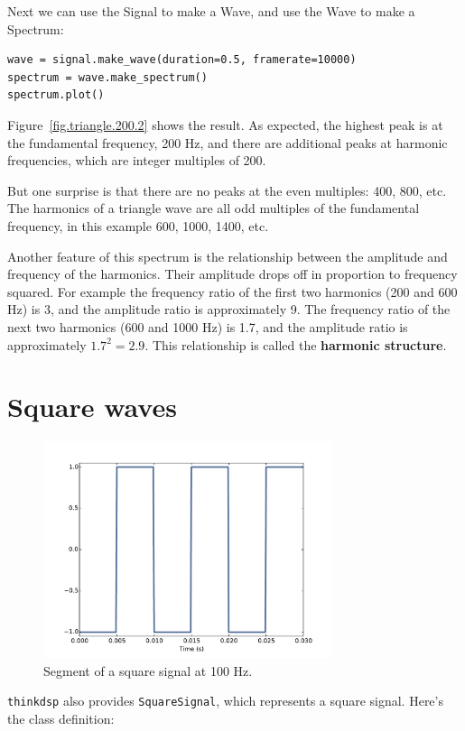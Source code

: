 \documentclass[12pt]{book}
\begin{document}
Next we can use the Signal to make a Wave, and use the Wave to
make a Spectrum:

\begin{verbatim}
wave = signal.make_wave(duration=0.5, framerate=10000)
spectrum = wave.make_spectrum()
spectrum.plot()
\end{verbatim}

Figure~\ref{fig.triangle.200.2} shows the result.  As expected, the
highest peak is at the fundamental frequency, 200 Hz, and there
are additional peaks at harmonic frequencies, which are integer
multiples of 200.

But one surprise is that there are no peaks at the even multiples:
400, 800, etc.  The harmonics of a triangle wave are all
odd multiples of the fundamental frequency, in this example
600, 1000, 1400, etc.

Another feature of this spectrum is the relationship between the
amplitude and frequency of the harmonics.  Their amplitude drops off
in proportion to frequency squared.  For example the frequency ratio
of the first two harmonics (200 and 600 Hz) is 3, and the amplitude
ratio is approximately 9.  The frequency ratio of the next two
harmonics (600 and 1000 Hz) is 1.7, and the amplitude ratio is
approximately $1.7^2 = 2.9$.  This relationship is called the
{\bf harmonic structure}.


\section{Square waves}
\label{square}

\begin{figure}
\centerline{\includegraphics[height=2.5in]{figs/square-100-1.pdf}}
\caption{Segment of a square signal at 100 Hz.}
\label{fig.square.100.1}
\end{figure}

{\tt thinkdsp} also provides {\tt SquareSignal}, which represents
a square signal.  Here's the class definition:
\end{document}

